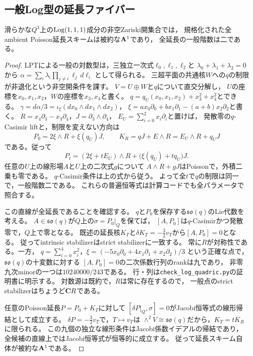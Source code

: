 
\subsection{一般Log型の延長ファイバー}
\label{subsec:quadric-log-fibres}
\begin{theorem}[一般対数型の全延長]\label{thm:quadric-generic-log-line}
滑らかな$Q^3$上の$\Log(1,1,1)$成分の非空Zariski開集合では，
規格化された全ambient Poisson延長スキームは被約な$\AA^1$であり，
全延長の一般階数は二である。
\end{theorem}
\begin{proof}
LPTによる一般の対数型は，三独立一次式$\ell_0,\ell_1,\ell_2$と
$\lambda_0+\lambda_1+\lambda_2=0$から
$\alpha=\sum_i\lambda_i\prod_{j\ne i}\ell_j\,d\ell_i$
として得られる\cite{LPT}。
三超平面の共通核$W$への$q$の制限が非退化という非空開条件を課す。
$V=U\oplus W$と$q$について直交分解し，
$U$の座標を$x_0,x_1,x_2$，$W$の座標を$x_3,x_4$と書く。
$q=q_U(x_0,x_1,x_2)+x_3^2+x_4^2$とできる。
$\gamma=d\alpha/3=\iota_\xi(dx_0\wedge dx_1\wedge dx_2)$，
$\xi=ax_0\partial_0+bx_1\partial_1-(a+b)x_2\partial_2$と書く。
$R=x_4\partial_3-x_3\partial_4$，$J=\partial_3\wedge\partial_4$，
$E_U=\sum_{i=0}^2x_i\partial_i$と置けば，
発散零の$q$-Casimir liftと，制限を変えない方向は
\[
 P_0=2\xi\wedge R+\xi(q_U)J,\qquad
 K_R=qJ+E\wedge R=E_U\wedge R+q_UJ
\]
である。従って
\[
 P_t=(2\xi+tE_U)\wedge R+
       \bigl(\xi(q_U)+tq_U\bigr)J.            \tag{L}\label{eq:quadric-log-line}
\]
任意の$U$上の線形場$A$と$U$上の二次式$g$について
$A\wedge R+gJ$はPoissonで，外積二乗も零である。
$q$-Casimir条件は上の式から従う。
よって全$t$で$q$の制限は同一で，一般階数二である。
これらの普遍恒等式は計算コードでも全パラメータで照合する。

この直線が全延長であることを確認する。
$q$と$P_0$を保存する$\mathfrak{so}(q)$のLie代数を考える。
$A\in\mathfrak{so}(q)$が$Q$上の$\sigma=P_0|_Q$を保てば，
$[A,P_0]$は$q$-Casimirかつ発散零で，$Q$上で零となる。
既述の延長核$K_T$と$\delta K_T=-\tfrac32v_T$から$[A,P_0]=0$となる。
従ってintrinsic stabilizerはstrict stabilizerに一致する。
常に$R$が対称性である。一方，
$q=\sum_{i=0}^4x_i^2$，$\xi=(-5x_0\partial_0+4x_1\partial_1+x_2\partial_2)/3$
という正確な点で，$\mathfrak{so}(q)$の十変数に対する
$[A,P_0]=0$の二次係数行列のrankは九であり，
非零九次minorの一つは$10240000/243$である。
行・列は\texttt{check\_log\_quadric.py}の証明書に明示する。
対数源は既約で，$R$は常に存在するので，
一般点のstrict stabilizerはちょうど$\CC R$である。

任意のPoisson延長$P=P_0+K_T$に対して
$[\delta P|_Q,\sigma]=0$がJacobi恒等式の線形帰結として成立する。
$\delta P=-\tfrac32v_T$で，$T\mapsto v_T$は
$\wedge^2V\cong\mathfrak{so}(q)$だから，$K_T=tK_R$に限られる。
この九個の独立な線形条件はJacobi係数イデアルの帰結であり，
全候補の直線上ではJacobi恒等式が恒等的に成立する。
従って延長スキーム自体が被約な$\AA^1$である。
\end{proof}

